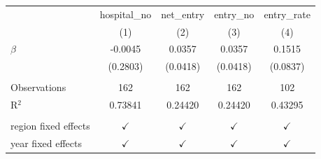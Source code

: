 \begingroup
\centering
\begin{tabular}{lcccc}
   \toprule
                        & hospital\_no  & net\_entry    & entry\_no     & entry\_rate\\   
                        & (1)           & (2)           & (3)           & (4)\\  
   \midrule 
   $\beta$              & -0.0045       & 0.0357        & 0.0357        & 0.1515\\   
                        & (0.2803)      & (0.0418)      & (0.0418)      & (0.0837)\\   
    \\
   Observations         & 162           & 162           & 162           & 102\\  
   R$^2$                & 0.73841       & 0.24420       & 0.24420       & 0.43295\\  
    \\
   region fixed effects & $\checkmark$  & $\checkmark$  & $\checkmark$  & $\checkmark$\\   
   year fixed effects   & $\checkmark$  & $\checkmark$  & $\checkmark$  & $\checkmark$\\   
   \bottomrule
\end{tabular}
\par\endgroup
